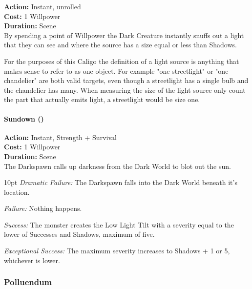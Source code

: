 \noindent \textbf{Action:} Instant, unrolled\\

\noindent \textbf{Cost:} 1 Willpower\\

\noindent \textbf{Duration:} Scene \\

By spending a point of Willpower the Dark Creature instantly snuffs out a light that they can see and where the source has a size equal or less than Shadows.

For the purposes of this Caligo the definition of a light source is anything that makes sense to refer to as one object. For example "one streetlight" or "one chandelier" are both valid targets, even though a streetlight has a single bulb and the chandelier has many. When measuring the size of the light source only count the part that actually emits light, a streetlight would be size one.


\paragraph*{Sundown (\textbullet\textbullet\textbullet)}

\noindent \textbf{Action:} Instant, Strength + Survival\\

\noindent \textbf{Cost:} 1 Willpower\\

\noindent \textbf{Duration:} Scene \\

The Darkspawn calls up darkness from the Dark World to blot out the sun. 

\begin{myindentpar}{10pt} \emph{Dramatic Failure:} The Darkspawn falls into the Dark World beneath it's location. 

    \emph{Failure:} Nothing happens. 

    \emph{Success:} The monster creates the Low Light Tilt with a severity equal to the lower of Successes and Shadows, maximum of five. 

    \emph{Exceptional Success:} The maximum severity increases to Shadows + 1 or 5, whichever is lower.

    \end{myindentpar}
	
\subsubsection*{Polluendum}

